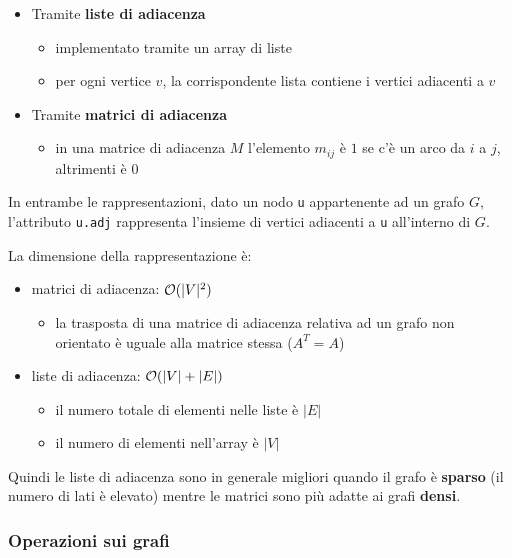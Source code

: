 \documentclass[italian, 10pt]{article}
\begin{document}
\begin{itemize}
  \item Tramite \textbf{liste di adiacenza}
        \begin{itemize}
          \item implementato tramite un array di liste
          \item per ogni vertice \(v\), la corrispondente lista contiene i vertici adiacenti a \(v\)
        \end{itemize}
  \item Tramite \textbf{matrici di adiacenza}
        \begin{itemize}
          \item in una matrice di adiacenza \(M\) l'elemento \(m_{ij}\) è \(1\) se c'è un arco da \(i\) a \(j\), altrimenti è \(0\)
        \end{itemize}
\end{itemize}

In entrambe le rappresentazioni, dato un nodo \texttt{u} appartenente ad un grafo \(G\), l'attributo \texttt{u.adj} rappresenta l'insieme di vertici adiacenti a \texttt{u} all'interno di \(G\).

\bigskip
La dimensione della rappresentazione è:

\begin{itemize}
  \item matrici di adiacenza: \(\mathcal{O}(|V|^2)\)
        \begin{itemize}
          \item la trasposta di una matrice di adiacenza relativa ad un grafo non orientato è uguale alla matrice stessa (\(A^T = A\))
        \end{itemize}
  \item liste di adiacenza: \(\mathcal{O}(|V|+|E|)\)
        \begin{itemize}
          \item il numero totale di elementi nelle liste è \(|E|\)
          \item il numero di elementi nell'array è \(|V|\)
        \end{itemize}
\end{itemize}

Quindi le liste di adiacenza sono in generale migliori quando il grafo è \textbf{sparso} (il numero di lati è elevato) mentre le matrici sono più adatte ai grafi \textbf{densi}.

\subsubsection{Operazioni sui grafi}
\end{document}
